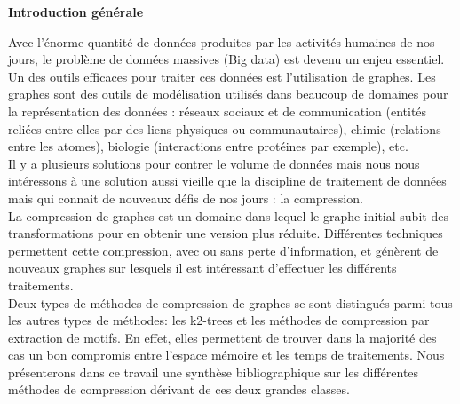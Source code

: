 \documentclass[a4paper,oneside,12pt]{report}
\theoremstyle{definition}
\begin{document}






\tableofcontents
\newpage

\listoffigures
{}
\cleardoublepage


\listoftables
{}
\cleardoublepage




		\Huge{ 
			\textbf {Introduction générale}} \\[0.5in]
			\normalsize
			Avec l'énorme quantité de données produites par les activités humaines de nos jours, le problème de données massives (Big data) est devenu un enjeu essentiel. Un des outils efficaces pour traiter ces données est l'utilisation de graphes. Les graphes sont des outils de modélisation utilisés dans beaucoup de domaines pour la représentation des données : réseaux sociaux et de communication (entités reliées entre elles par des liens physiques ou communautaires), chimie (relations entre les atomes), biologie (interactions entre protéines par exemple), etc.\\
			
Il y a plusieurs solutions pour contrer le volume de données mais nous nous intéressons à une solution aussi vieille que la discipline de traitement de données mais qui connait de nouveaux défis de nos jours : la compression.\\

La compression de graphes est un domaine dans lequel le graphe initial subit des transformations pour en obtenir une version plus réduite. Différentes techniques permettent cette compression, avec ou sans perte d'information, et génèrent de nouveaux graphes sur lesquels il est intéressant d'effectuer les différents traitements.\\ 

Deux types de méthodes de compression de graphes se sont distingués parmi tous les autres types de méthodes: les k2-trees et les méthodes de compression par extraction de motifs. En effet, elles permettent de trouver dans la majorité des cas un bon compromis entre l'espace mémoire et les temps de traitements. Nous présenterons dans ce travail une synthèse bibliographique sur les différentes méthodes de compression dérivant de ces deux grandes classes.	\\
		
\end{document}
